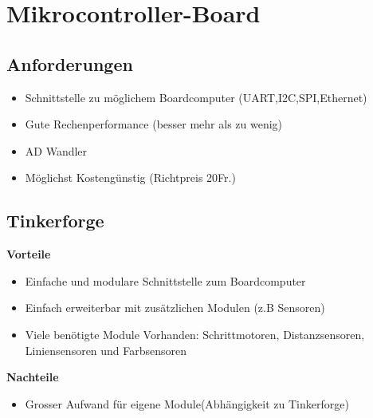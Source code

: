 \section{Mikrocontroller-Board}
\subsection{Anforderungen}
\begin{itemize}
\item Schnittstelle zu möglichem Boardcomputer (UART,I2C,SPI,Ethernet)
\item Gute Rechenperformance (besser mehr als zu wenig)
\item AD Wandler 
\item Möglichst Kostengünstig (Richtpreis 20Fr.)
\end{itemize}


\subsection{Tinkerforge}
\textbf {Vorteile}
\begin{itemize}
\item Einfache und modulare Schnittstelle zum Boardcomputer
\item Einfach erweiterbar mit zusätzlichen Modulen (z.B Sensoren)
\item Viele benötigte Module Vorhanden: Schrittmotoren, Distanzsensoren, Liniensensoren und Farbsensoren\\
\end{itemize}
\textbf {Nachteile}
\begin{itemize}
\item Grosser Aufwand für eigene Module(Abhängigkeit zu Tinkerforge)
\end{itemize}


